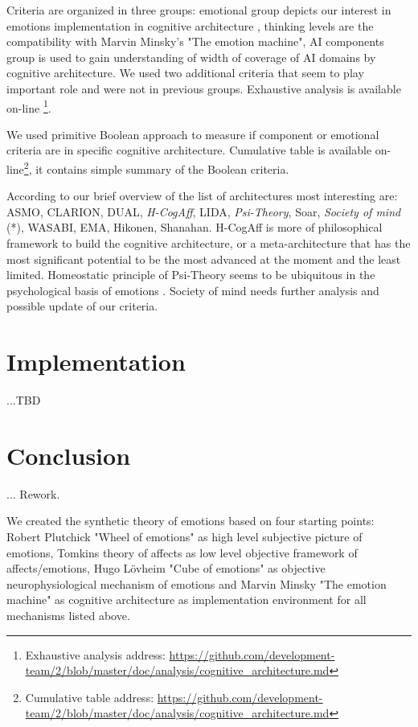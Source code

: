 Criteria are organized in three groups: emotional group depicts our interest in emotions implementation in cognitive architecture \cite{computationalmodelsemotionscognition}, thinking levels are the compatibility with Marvin Minsky's "The emotion machine", AI components group is used to gain understanding of width of coverage of AI domains by cognitive architecture. We used two additional criteria that seem to play important role and were not in previous groups. Exhaustive analysis is available on-line \footnote{Exhaustive analysis address: \url{https://github.com/development-team/2/blob/master/doc/analysis/cognitive_architecture.md}}.

We used primitive Boolean approach to measure if component or emotional criteria are in specific cognitive architecture. Cumulative table is available on-line\footnote{Cumulative table address: \url{https://github.com/development-team/2/blob/master/doc/analysis/cognitive_architecture.md}}, it contains simple summary of the Boolean criteria.

According to our brief overview of the list of architectures most interesting are: ASMO, CLARION, DUAL, \emph{H-CogAff}, LIDA, \emph{Psi-Theory}, Soar, \emph{Society of mind} (*), WASABI, EMA, Hikonen, Shanahan.
H-CogAff is more of philosophical framework to build the cognitive architecture, or a meta-architecture that has the most significant potential to be the most advanced at the moment and the least limited. Homeostatic principle of Psi-Theory seems to be ubiquitous in the psychological basis of emotions \cite{natureofemotions}. Society of mind needs further analysis and possible update of our criteria.

\section{Implementation}

...TBD

\cite{on_role_of_emotion}

\section{Conclusion}

... Rework.

We created the synthetic theory of emotions based on four starting points: Robert Plutchick "Wheel of emotions" \cite{natureofemotions, senticcomputing} as high level subjective picture of emotions, Tomkins theory of affects \cite{primer_affect_psychology} as low level objective framework of affects/emotions, Hugo L\"{o}vheim "Cube of emotions" \cite{cubeofemotions} as objective neurophysiological mechanism of emotions and Marvin Minsky "The emotion machine" \cite{emotionmachine} as cognitive architecture as implementation environment for all mechanisms listed above.

